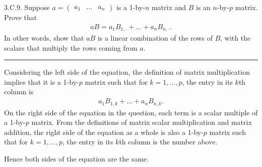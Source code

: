 \documentclass[a5paper]{article}
\begin{document}
\newcommand   \C           {\mathbf{C}}
\newcommand   \R           {\mathbf{R}}
\renewcommand \L           {\mathcal{L}}
\newcommand   \F           {\mathbf{F}}
\renewcommand \P           {\mathcal{P}}
\newcommand   \M           {\mathcal{M}}
\newcommand   \op          {\operatorname}


    3.C.9.
    Suppose $a = \begin{pmatrix} a_1 & \dots & a_n \end{pmatrix}$ is a 1-by-$n$ matrix and $B$ is an $n$-by-$p$ matrix.
    Prove that
\begin{align*}
        aB = a_1B_{1,\cdot} + \dots + a_nB_{n,\cdot} .
\end{align*}
    In other words, show that $aB$ is a linear combination of the rows of $B$, with the scalars that multiply the rows coming from $a$.

\rule{\linewidth}{0.4pt}


    Considering the left side of the equation, the definition of matrix multiplication implies that it is a 1-by-$p$ matrix such that for $k = 1,\dots,p$, the entry in its $k$th column is
\begin{align*}
        a_1B_{1,k} + \dots + a_nB_{n,k} .
\end{align*}
    On the right side of the equation in the question, each term is a scalar multiple of a 1-by-$p$ matrix.
    From the definitions of matrix scalar multiplication and matrix addition, the right side of the equation as a whole is also a 1-by-$p$ matrix such that for $k = 1,\dots,p$, the entry in its $k$th column is the number above.

    Hence both sides of the equation are the same.
\end{document}
